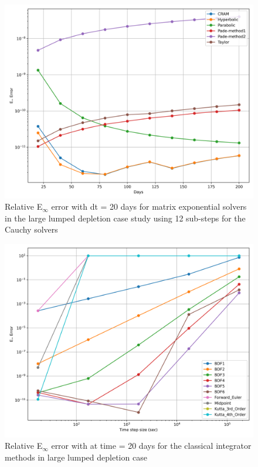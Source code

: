 \clearpage

\begin{figure}[p]
    \centering
    \includegraphics[width=5in]{images/chapter-5/caseStudies/largeLumpedDepletion/msrlargeLumpDepletionEinfErrorerrorSteps12.png}
    \caption{Relative E$_{\infty}$ error with dt = 20 days for matrix exponential solvers in the large lumped depletion case study using 12 sub-steps for the Cauchy solvers}
    \label{fig:large_lumped_depletion_Einf_steps12}
\end{figure}

\clearpage

\begin{figure}[p]
    \centering
    \includegraphics[width=5in]{images/chapter-5/caseStudies/largeLumpedDepletion/msrLargeLumpedDepletionEinfErrorerrorIntegrators.png}
    \caption{Relative E$_{\infty}$ error with at time = 20 days for the classical integrator methods in large lumped depletion case}
    \label{fig:large_lumped_depletion_Einf_integrators}
\end{figure}

